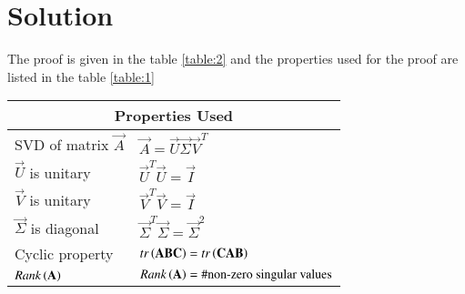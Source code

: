 \documentclass[journal,12pt,twocolumn]{IEEEtran}
\numberwithin{table}{section}
\begin{document}
\section{Solution}
The proof is given in the table \ref{table:2} and the properties used for the proof are listed in the table \ref{table:1}
\renewcommand{\thetable}{1}
\begin{table*}[ht!]
\begin{center}
\begin{tabular}{|l|l|}
\hline
\multicolumn{2}{|c|}{
\textbf{Properties Used}}\\
\hline
SVD of matrix $\vec{A}$ & $\vec{A}=\vec{U}\vec{\Sigma}\vec{V}^T$\\[0.5ex]
\hline
$\vec{U}$ is unitary & $\vec{U}^T\vec{U}=\vec{I}$\\[0.5ex] 
\hline
$\vec{V}$ is unitary & $\vec{V}^T\vec{V}=\vec{I}$\\[0.5ex] 
\hline
$\vec{\Sigma}$ is diagonal & $\vec{\Sigma}^T\vec{\Sigma}=\vec{\Sigma}^2$\\[0.5ex] 
\hline
Cyclic property & $tr\left(\mathbf{ABC}\right)=tr\left(\mathbf{CAB}\right)$\\[0.5ex] 
\hline
$Rank\left(\mathbf{A}\right)$ & $Rank\left(\mathbf{A}\right)=\# \text{non-zero singular values}$\\[0.5ex] 
\hline
\end{tabular}
\caption{Properties}
\label{table:1}
\end{center}
\vspace{-0.5cm}
\end{table*}
\renewcommand{\thetable}{2}
\end{document}
